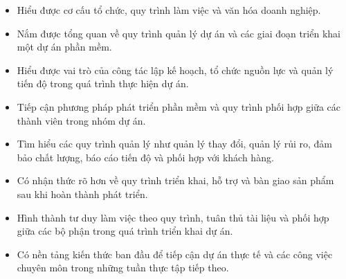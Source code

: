 \begin{itemize}
    \item Hiểu được cơ cấu tổ chức, quy trình làm việc và văn hóa doanh nghiệp.
    
    \item Nắm được tổng quan về quy trình quản lý dự án và các giai đoạn triển khai một dự án phần mềm.
    
    \item Hiểu được vai trò của công tác lập kế hoạch, tổ chức nguồn lực và quản lý tiến độ trong quá trình thực hiện dự án.
    
    \item Tiếp cận phương pháp phát triển phần mềm và quy trình phối hợp giữa các thành viên trong nhóm dự án.
    
    \item Tìm hiểu các quy trình quản lý như quản lý thay đổi, quản lý rủi ro, đảm bảo chất lượng, báo cáo tiến độ và phối hợp với khách hàng.
    
    \item Có nhận thức rõ hơn về quy trình triển khai, hỗ trợ và bàn giao sản phẩm sau khi hoàn thành phát triển.
    
    \item Hình thành tư duy làm việc theo quy trình, tuân thủ tài liệu và phối hợp giữa các bộ phận trong quá trình triển khai dự án.
    
    \item Có nền tảng kiến thức ban đầu để tiếp cận dự án thực tế và các công việc chuyên môn trong những tuần thực tập tiếp theo.
\end{itemize}
